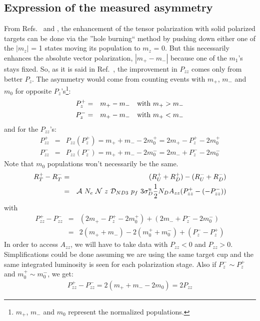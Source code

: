 \documentclass[11pt]{article}
\begin{document}
\subsection{Expression of the measured asymmetry}

From Refs.~\cite{meyer} and \cite{uvatn}, the enhancement of the  tensor polarization with solid polarized targets can be done via the ''hole burning`` method by pushing down either one of the $|m_z|$ = 1 states moving its population to $m_z$ = 0. But this necessarily enhances the absolute vector polarization, $|m_+ - m_-|$ because one of the $m_1$'s stays fixed.
So, as it is said in Ref.~\cite{meyer}, the improvement in $P_{zz}$ comes only from better $P_z$. The asymmetry would come from counting events with $m_+$, $m_-$ and $m_0$ for opposite $P_z$'s\footnote{$m_+$, $m_-$ and $m_0$ represent the normalized populations.}:
\begin{eqnarray}
P_z^+ &=& m_+ - m_- ~~~{\rm with}~  m_+ > m_- \\
P_z^- &=& m_+ - m_- ~~~{\rm with}~ m_+ < m_-
\label{p1} 
\end{eqnarray}
and for the  $P_{zz}$'s:
\begin{eqnarray}
P_{zz}^+ &=& P_{zz}(P_z^+) = m_+ + m_- - 2m_0^+ = 2m_+ - P_z^+ - 2m_0^+ \\
P_{zz}^- &=& P_{zz}(P_z^-) =  m_+ + m_- - 2m_0^- =   2m_- + P_z^- - 2m_0^-
\label{p2} 
\end{eqnarray}
Note that $m_0$ populations won't necessarily be the same.
\begin{eqnarray}
R^+_T - R^-_T &=& (R_U^+ + R_D^+)- (R_U^- + R_D^-) \\ 
                            &=& {\cal A}~N_e~{\cal N}~z~ {\cal D}_{ND3}~p_f~ 3 \sigma^u_D \frac{1}{2} N_D A_{zz} (P_{zz}^+ - (- P_{zz}^-))
\label{p3} 
\end{eqnarray}
with 
\begin{eqnarray}
P_{zz}^+ - P_{zz}^- &=& (2m_+ - P_z^+ - 2m_0^+) + (2m_- + P_z^- - 2m_0^-) \\
                                    &=& 2 (m_+ + m_-) - 2(m_0^+ + m_0^-) + (P_z^- - P_z^+)
\label{p3} 
\end{eqnarray}
In order to access $A_{zz}$, we will have to take data with $P_{zz} < 0$ and  $P_{zz} > 0$.
Simplifications could be done assuming we are using the same target cup and the same integrated luminosity is seen for each polarization stage.
Also if $P_z^- \sim P_z^+$ and $m_0^+ \sim m_0^-$, we get:
\begin{eqnarray}
P_{zz}^+ - P_{zz}^- = 2 (m_+ + m_- - 2 m_0) = 2 P_{zz}
\label{p4} 
\end{eqnarray}
\end{document}

